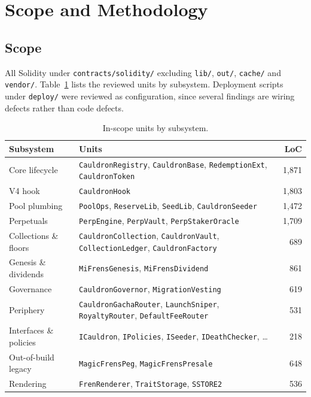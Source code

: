 \documentclass[10pt,a4paper]{article}
\newcommand{\code}[1]{\texttt{\small #1}}
\begin{document}
\tableofcontents
\newpage

\section{Scope and Methodology}

\subsection{Scope}
All Solidity under \code{contracts/solidity/} excluding \code{lib/}, \code{out/},
\code{cache/} and \code{vendor/}. Table~\ref{tab:scope} lists the reviewed units by
subsystem. Deployment scripts under \code{deploy/} were reviewed as configuration, since
several findings are wiring defects rather than code defects.

\begin{table}[h]
\centering\small
\begin{tabular}{@{}llr@{}}
\toprule
\textbf{Subsystem} & \textbf{Units} & \textbf{LoC} \\
\midrule
Core lifecycle & \code{CauldronRegistry}, \code{CauldronBase}, \code{RedemptionExt}, \code{CauldronToken} & 1{,}871 \\
V4 hook & \code{CauldronHook} & 1{,}803 \\
Pool plumbing & \code{PoolOps}, \code{ReserveLib}, \code{SeedLib}, \code{CauldronSeeder} & 1{,}472 \\
Perpetuals & \code{PerpEngine}, \code{PerpVault}, \code{PerpStakerOracle} & 1{,}709 \\
Collections \& floors & \code{CauldronCollection}, \code{CauldronVault}, \code{CollectionLedger}, \code{CauldronFactory} & 689 \\
Genesis \& dividends & \code{MiFrensGenesis}, \code{MiFrensDividend} & 861 \\
Governance & \code{CauldronGovernor}, \code{MigrationVesting} & 619 \\
Periphery & \code{CauldronGachaRouter}, \code{LaunchSniper}, \code{RoyaltyRouter}, \code{DefaultFeeRouter} & 531 \\
Interfaces \& policies & \code{ICauldron}, \code{IPolicies}, \code{ISeeder}, \code{IDeathChecker}, \ldots & 218 \\
Out-of-build legacy & \code{MagicFrensPeg}, \code{MagicFrensPresale} & 648 \\
Rendering & \code{FrenRenderer}, \code{TraitStorage}, \code{SSTORE2} & 536 \\
\bottomrule
\end{tabular}
\caption{In-scope units by subsystem.}\label{tab:scope}
\end{table}
\end{document}
